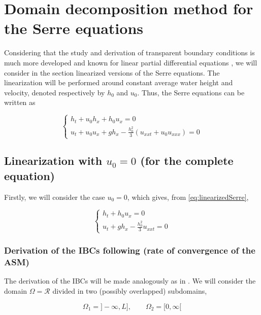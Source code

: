 \section{Domain decomposition method for the Serre equations}

\indent Considering that the study and derivation of transparent boundary conditions is much more developed and known for linear partial differential equations \cite{Szeftel2006}, we will consider in the section linearized versions of the Serre equations. The linearization will be performed around constant average water height and velocity, denoted respectively by $h_0$ and $u_0$. Thus, the Serre equations can be written as

\begin{equation}
\label{eq:linearizedSerre}
\begin{cases}
h_t + u_0h_x + h_0u_x = 0 \\
u_t + u_0u_x + gh_x - \frac{h_0^2}{3}(u_{xxt}+u_0u_{xxx}) = 0
\end{cases}
\end{equation} 


\subsection{Linearization with $u_0 = 0$ (for the complete equation)}

\indent Firstly, we will consider the case $u_0 = 0$, which gives, from \eqref{eq:linearizedSerre},

\begin{equation}
\label{eq:linearizedSerre2}
\begin{cases}
h_t + h_0u_x = 0 \\
u_t +  gh_x - \frac{h_0^2}{3}u_{xxt} = 0
\end{cases}
\end{equation} 

\subsubsection{Derivation of the IBCs following \cite{Gander2001B} (rate of convergence of the ASM)}

\indent The derivation of the IBCs will be made analogously as in \cite{Gander2001B}. We will consider the domain $\Omega = \mathcal{R}$ divided in two (possibly overlapped) subdomains, 

\begin{equation*}
\Omega_1 = ]-\infty,L], \qquad \Omega_2 = [0,\infty[
\end{equation*}

